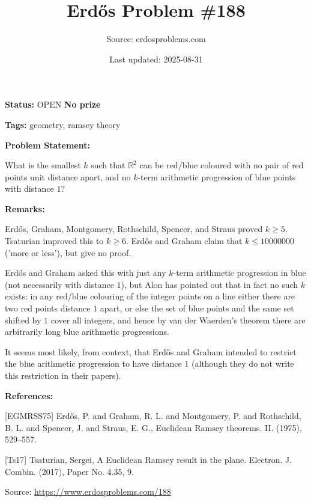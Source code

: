 \documentclass{article}
\title{Erd\H{o}s Problem \#188}
\date{Last updated: 2025-08-31}
\author{Source: erdosproblems.com}
\begin{document}
\maketitle

\noindent\textbf{Status:} OPEN \quad \textbf{No prize}

\noindent\textbf{Tags:} geometry, ramsey theory

\medskip
\noindent\textbf{Problem Statement:}

What is the smallest $k$ such that $\mathbb{R}^2$ can be red/blue coloured with no pair of red points unit distance apart, and no $k$-term arithmetic progression of blue points with distance $1$?

\bigskip
\noindent\textbf{Remarks:}

Erd\H{o}s, Graham, Montgomery, Rothschild, Spencer, and Straus \cite{EGMRSS75} proved $k\geq 5$. Tsaturian \cite{Ts17} improved this to $k\geq 6$. Erd\H{o}s and Graham claim that $k\leq 10000000$ ('more or less'), but give no proof.

Erd\H{o}s and Graham asked this with just any $k$-term arithmetic progression in blue (not necessarily with distance $1$), but Alon has pointed out that in fact no such $k$ exists: in any red/blue colouring of the integer points on a line either there are two red points distance $1$ apart, or else the set of blue points and the same set shifted by $1$ cover all integers, and hence by van der Waerden's theorem there are arbitrarily long blue arithmetic progressions.

It seems most likely, from context, that Erd\H{o}s and Graham intended to restrict the blue arithmetic progression to have distance $1$ (although they do not write this restriction in their papers).

\bigskip
\noindent\textbf{References:}

[EGMRSS75] Erd\H{o}s, P. and Graham, R. L. and Montgomery, P. and
Rothschild, B. L. and Spencer, J. and Straus, E. G., Euclidean {R}amsey theorems. {II}. (1975), 529--557.
 
 [Ts17] Tsaturian, Sergei, A {E}uclidean {R}amsey result in the plane. Electron. J. Combin. (2017), Paper No. 4.35, 9.

\bigskip
\noindent\small{Source: \url{https://www.erdosproblems.com/188}}
\end{document}
